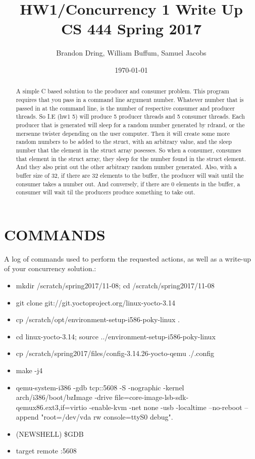 \documentclass{article}
\author{Brandon Dring, William Buffum, Samuel Jacobs}
\date{\today}
\title{HW1/Concurrency 1 Write Up \\ CS 444 Spring 2017 }
\begin{document}
\maketitle
\begin{abstract}
    A simple C based solution to the producer and consumer problem. This program requires that you pass in a command line argument number. Whatever number that is passed in at the
    command line, is the number of respective consumer and producer threads. So I.E (hw1 5) will produce 5 producer threads and 5 consumer threads. Each producer that is generated will sleep for a random number generated by rdrand, or the mersenne twister depending on the user computer. Then it will create some more random numbers to be added to the struct, with an arbitrary value, and the sleep number that the element in the struct array posesses. So when a consumer, consumes that element in the struct array, they sleep for the number found in the struct element. And they also print out the other arbitrary random number generated. Also, with a buffer size of 32, if there are 32 elements to the buffer, the producer will wait until the consumer takes a number out. And conversely, if there are 0 elements in the buffer, a consumer will wait til the producers produce something to take out. \newpage
\end{abstract} 
\section{COMMANDS}
A log of commands used to perform the requested actions, as well as a write-up of your concurrency solution.:\\
    \begin{itemize}
        \item mkdir /scratch/spring2017/11-08; cd /scratch/spring2017/11-08\\
        \item git clone git://git.yoctoproject.org/linux-yocto-3.14\\
        \item cp /scratch/opt/environment-setup-i586-poky-linux .\\
        \item cd linux-yocto-3.14; source ../environment-setup-i586-poky-linux\\
        \item cp /scratch/spring2017/files/config-3.14.26-yocto-qemu ./.config\\
        \item make -j4\\
        \item qemu-system-i386 -gdb tcp::5608 -S -nographic -kernel arch/i386/boot/bzImage -drive file=core-image-lsb-sdk-qemux86.ext3,if=virtio -enable-kvm -net none -usb -localtime --no-reboot --append "root=/dev/vda rw console=ttyS0 debug".\\
        \item (NEWSHELL) \$GDB
        \item target remote :5608  \\
\end{itemize} \newpage
\end{document}
